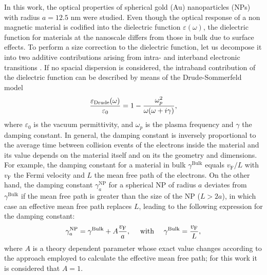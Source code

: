 
In this work, the optical properties of spherical gold (Au) nanoparticles (NPs) with radius $a = 12.5$ nm were studied. Even though the optical response of a non magnetic material is codified into the dielectric function $\varepsilon(\omega)$, the dielectric function for materials at the nanoscale differs from those in bulk due to surface effects. To perform a size correction to the dielectric function, let us decompose it into two additive contributions arising from intra- and interband electronic transitions \cite{noguez_surface_2007}. If no spacial dispersion is considered, the intraband contribution of the dielectric function can be described by means of the Drude-Sommerfeld model
%
\begin{align}
\frac{\varepsilon_\text{\scriptsize Drude}(\omega)}{\varepsilon_0} = 1 - \frac{\omega_p^2}{\omega(\omega + i \gamma)},
\label{eq:Drude}
\end{align}
%
where $\varepsilon_0$ is the vacuum permittivity, and $\omega_p$ is the plasma frequency and $\gamma$ the damping constant. In general, the damping constant is inversely proportional to the average time between collision events of the electrons inside the material and its value depends on the material itself and on its the geometry and dimensions. For example, the damping constant for a material in bulk $\gamma^\text{Bulk}$ equals $v_\text{F}/L$  with $v_\text{F}$ the Fermi velocity and $L$ the  mean free path of the electrons. On the other hand, the damping constant $\gamma^\text{NP}_a$ for a spherical NP of radius $a$ deviates from $\gamma^\text{Bulk}$ if the mean free path is greater than the size of the NP ($ L > 2a $), in which case an effective  mean free path replaces $L$, leading to the following expression for the damping constant:
%
\begin{align}
\gamma^\text{\scriptsize  NP}_a =  \gamma^\text{\scriptsize Bulk} + A\frac{v_\text{F}}{a},
\qqtext{ with }
\gamma^\text{\scriptsize  Bulk} = \frac{v_\text{F}}{L},
\label{eq:SC}
\end{align}
%
where $A$ is a theory dependent parameter whose exact value changes according to the approach employed to calculate the effective mean free path; for this work it is considered that $A = 1$.

